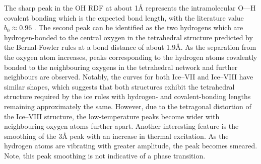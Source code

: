 \par
The sharp peak in the OH RDF at about 1\AA{}  represents the intramolecular O---H covalent bonding which is the
expected bond length, with the literature value $b_0 \approx 0.96$ \cite{kuhs1984}.
The second peak can be identified as the two hydrogens which are hydrogen-bonded to the central oxygen in the
tetrahedral structure predicted by the Bernal-Fowler rules at a bond distance of about 1.9\AA{}.
As the separation from the oxygen atom increases, peaks corresponding to the hydrogen atoms covalently bonded
to the neighbouring oxygens in the tetrahedral network and further neighbours are observed.
Notably, the curves for both Ice--VII and Ice--VIII have similar shapes, which suggests that both structures
exhibit the tetrahedral structure required by the ice rules with hydrogen- and covalent-bonding lengths remaining
approximately the same.
However, due to the tetragonal distortion of the Ice--VIII structure, the low-temperature peaks become wider
with neighbouring oxygen atoms further apart.
Another interesting feature is the smoothing of the 3\AA{} peak with an increase in thermal excitation.
As the hydrogen atoms are vibrating with greater amplitude, the peak becomes smeared.
Note, this peak smoothing is not indicative of a phase transition.

